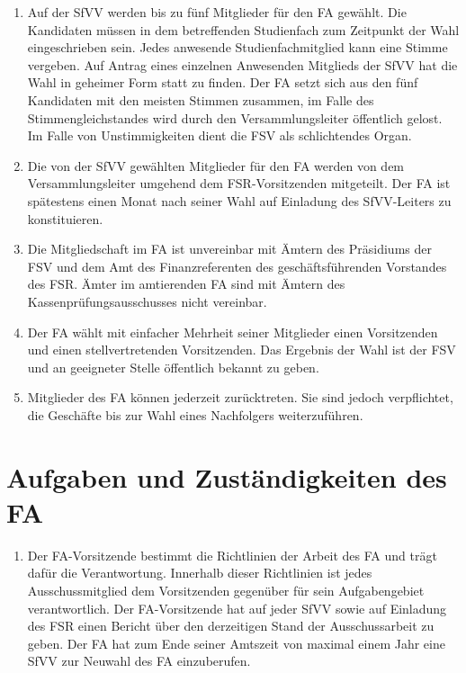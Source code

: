 \documentclass{article}
\begin{document}
\begin{enumerate}[(1)]
	\item Auf der SfVV werden bis zu fünf Mitglieder für den FA gewählt. Die Kandidaten müssen in dem betreffenden Studienfach zum Zeitpunkt der Wahl eingeschrieben sein. Jedes anwesende Studienfachmitglied kann eine Stimme vergeben. Auf Antrag eines einzelnen Anwesenden Mitglieds der SfVV hat die Wahl in geheimer Form statt zu finden. Der FA setzt sich aus den fünf Kandidaten mit den meisten Stimmen zusammen, im Falle des Stimmengleichstandes wird durch den Versammlungsleiter öffentlich gelost. Im Falle von Unstimmigkeiten dient die FSV als schlichtendes Organ.
	\item Die von der SfVV gewählten Mitglieder für den FA werden von dem Versammlungsleiter umgehend dem FSR-Vorsitzenden mitgeteilt. Der FA ist spätestens einen Monat nach seiner Wahl auf Einladung des SfVV-Leiters zu konstituieren.
	\item Die Mitgliedschaft im FA ist unvereinbar mit Ämtern des Präsidiums der FSV und dem Amt des Finanzreferenten des geschäftsführenden Vorstandes des FSR. Ämter im amtierenden FA sind mit Ämtern des Kassenprüfungsausschusses nicht vereinbar.
	\item Der FA wählt mit einfacher Mehrheit seiner Mitglieder einen Vorsitzenden und einen stellvertretenden Vorsitzenden. Das Ergebnis der Wahl ist der FSV und an geeigneter Stelle öffentlich bekannt zu geben.
	\item Mitglieder des FA können jederzeit zurücktreten. Sie sind jedoch verpflichtet, die Geschäfte bis zur Wahl eines Nachfolgers weiterzuführen.
\end{enumerate}

\section{Aufgaben und Zuständigkeiten des FA}\label{aufgaben-und-zustuxe4ndigkeiten-des-fa}

\begin{enumerate}[(1)]
	\item Der FA-Vorsitzende bestimmt die Richtlinien der Arbeit des FA und trägt dafür die Verantwortung. Innerhalb dieser Richtlinien ist jedes Ausschussmitglied dem Vorsitzenden gegenüber für sein Aufgabengebiet verantwortlich. Der FA-Vorsitzende hat auf jeder SfVV sowie auf Einladung des FSR einen Bericht über den derzeitigen Stand der Ausschussarbeit zu geben. Der FA hat zum Ende seiner Amtszeit von maximal einem Jahr eine SfVV zur Neuwahl des FA einzuberufen.
\end{enumerate}
\end{document}

